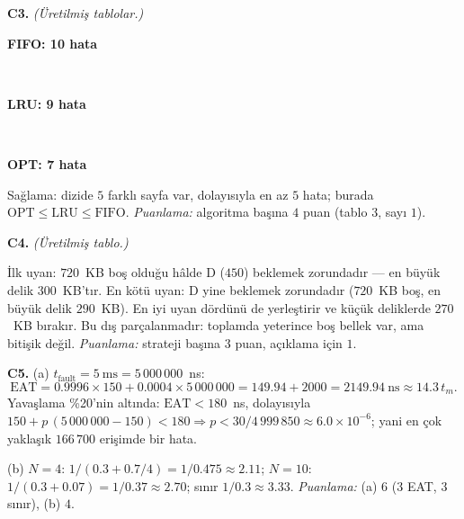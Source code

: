 \textbf{C3.} \textit{(Üretilmiş tablolar.)}
\begin{center}
\begin{minipage}{\linewidth}\centering\textbf{FIFO: 10 hata}\\[0.2em]\end{minipage}\\[0.8em]
\begin{minipage}{\linewidth}\centering\textbf{LRU: 9 hata}\\[0.2em]\end{minipage}\\[0.8em]
\begin{minipage}{\linewidth}\centering\textbf{OPT: 7 hata}\\[0.2em]\end{minipage}
\end{center}
Sağlama: dizide $5$ farklı sayfa var, dolayısıyla en az $5$ hata; burada $\text{OPT} \le \text{LRU} \le \text{FIFO}$. \textit{Puanlama:} algoritma başına $4$ puan (tablo $3$, sayı $1$).

\textbf{C4.} \textit{(Üretilmiş tablo.)}
\begin{center}\small{}\end{center}
İlk uyan: $720$~KB boş olduğu hâlde D ($450$) beklemek zorundadır --- en büyük delik $300$~KB'tır. En kötü uyan: D yine beklemek zorundadır ($720$~KB boş, en büyük delik $290$~KB). En iyi uyan dördünü de yerleştirir ve küçük deliklerde $270$~KB bırakır. Bu dış parçalanmadır: toplamda yeterince boş bellek var, ama bitişik değil. \textit{Puanlama:} strateji başına $3$ puan, açıklama için $1$.

\textbf{C5.} (a) $t_{\text{fault}} = 5\ \text{ms} = 5\,000\,000$~ns:
\[
\text{EAT} = 0.9996 \times 150 + 0.0004 \times 5\,000\,000 = 149.94 + 2000 = 2149.94\ \text{ns} \approx 14.3\,t_m .
\]
Yavaşlama \%20'nin altında: $\text{EAT} < 180$~ns, dolayısıyla $150 + p\,(5\,000\,000 - 150) < 180 \Rightarrow p < 30/4\,999\,850 \approx 6.0\times10^{-6}$; yani en çok yaklaşık $166\,700$ erişimde bir hata.

(b) $N = 4$: $1/(0.3 + 0.7/4) = 1/0.475 \approx 2.11$; $N = 10$: $1/(0.3 + 0.07) = 1/0.37 \approx 2.70$; sınır $1/0.3 \approx 3.33$.
\textit{Puanlama:} (a) $6$ ($3$ EAT, $3$ sınır), (b) $4$.

